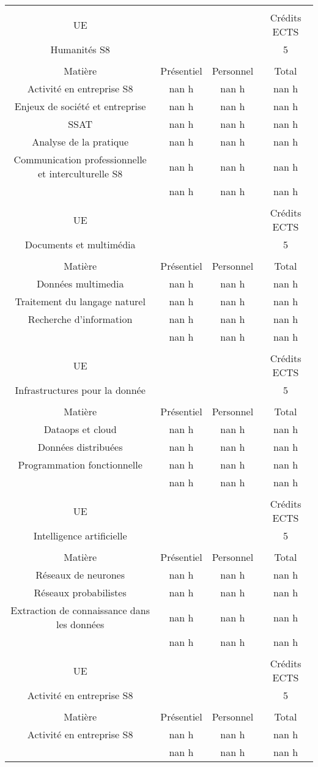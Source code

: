 \begin{longtable}{c c c c}%
&&&\\%
UE&&&Crédits ECTS\\%
Humanités S8&&&5\\%
&&&\\%
Matière&Présentiel&Personnel&Total\\%
Activité en entreprise S8&nan h&nan h&nan h\\%
Enjeux de société et entreprise&nan h&nan h&nan h\\%
SSAT&nan h&nan h&nan h\\%
Analyse de la pratique&nan h&nan h&nan h\\%
Communication professionnelle et interculturelle S8&nan h&nan h&nan h\\%
\hline%
&nan h&nan h&nan h\\%
\hline%
&&&\\%
UE&&&Crédits ECTS\\%
Documents et multimédia&&&5\\%
&&&\\%
Matière&Présentiel&Personnel&Total\\%
Données multimedia&nan h&nan h&nan h\\%
Traitement du langage naturel&nan h&nan h&nan h\\%
Recherche d'information&nan h&nan h&nan h\\%
\hline%
&nan h&nan h&nan h\\%
\hline%
&&&\\%
UE&&&Crédits ECTS\\%
Infrastructures pour la donnée&&&5\\%
&&&\\%
Matière&Présentiel&Personnel&Total\\%
Dataops et cloud&nan h&nan h&nan h\\%
Données distribuées&nan h&nan h&nan h\\%
Programmation fonctionnelle&nan h&nan h&nan h\\%
\hline%
&nan h&nan h&nan h\\%
\hline%
&&&\\%
UE&&&Crédits ECTS\\%
Intelligence artificielle&&&5\\%
&&&\\%
Matière&Présentiel&Personnel&Total\\%
Réseaux de neurones&nan h&nan h&nan h\\%
Réseaux probabilistes&nan h&nan h&nan h\\%
Extraction de connaissance dans les données&nan h&nan h&nan h\\%
\hline%
&nan h&nan h&nan h\\%
\hline%
&&&\\%
UE&&&Crédits ECTS\\%
Activité en entreprise S8&&&5\\%
&&&\\%
Matière&Présentiel&Personnel&Total\\%
Activité en entreprise S8&nan h&nan h&nan h\\%
\hline%
&nan h&nan h&nan h\\%
\hline%
\end{longtable}